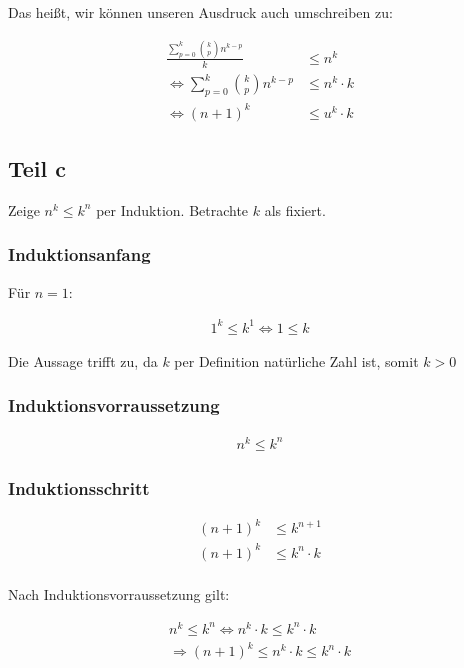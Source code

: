 \documentclass[a4paper,german,12pt,smallheadings]{scrartcl}
\begin{document}
Das heißt, wir können unseren Ausdruck auch umschreiben zu:

\begin{align*}
  \frac{\sum_{p=0}^k {k \choose p} n^{k-p}}{k} &\le n^k \\
  \Leftrightarrow \sum_{p=0}^k {k \choose p} n^{k-p} &\le n^k \cdot k\\
  \Leftrightarrow (n+1)^k &\le u^k \cdot k
\end{align*}

\subsection*{Teil c}

Zeige $n^k \le k^n$ per Induktion. Betrachte $k$ als fixiert.

\subsubsection*{Induktionsanfang}

Für $n=1$:

\begin{align*}
  1^k \le k^1 \Leftrightarrow 1 \le k
\end{align*}

Die Aussage trifft zu, da $k$ per Definition natürliche Zahl ist, somit $k > 0$

\subsubsection*{Induktionsvorraussetzung}

\begin{align*}
  n^k \le k^n
\end{align*}

\subsubsection*{Induktionsschritt}

\begin{align*}
  (n+1)^k &\le k^{n+1} \\
  (n+1)^k &\le k^n \cdot k \\
\end{align*}

Nach Induktionsvorraussetzung gilt:

\begin{align*}
  n^k \le k^n \Leftrightarrow n^k \cdot k \le k^n \cdot k \\
  \Rightarrow (n+1)^k \le n^k \cdot k \le k^n \cdot k
\end{align*}
\end{document}
